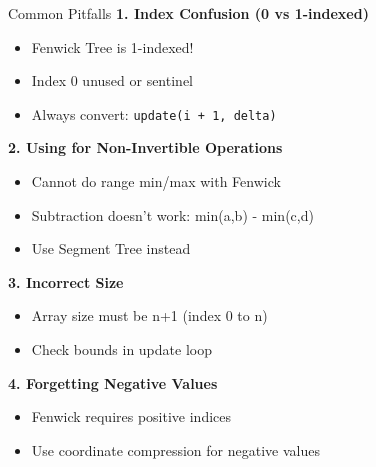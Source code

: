 \documentclass[aspectratio=169]{beamer}
\begin{document}
\begin{frame}{Common Pitfalls}
  \textbf{1. Index Confusion (0 vs 1-indexed)}
  \begin{itemize}
    \item Fenwick Tree is 1-indexed!
    \item Index 0 unused or sentinel
    \item Always convert: \texttt{update(i + 1, delta)}
  \end{itemize}

  \vspace{0.3cm}
  \textbf{2. Using for Non-Invertible Operations}
  \begin{itemize}
    \item Cannot do range min/max with Fenwick
    \item Subtraction doesn't work: min(a,b) - min(c,d)
    \item Use Segment Tree instead
  \end{itemize}

  \vspace{0.3cm}
  \textbf{3. Incorrect Size}
  \begin{itemize}
    \item Array size must be n+1 (index 0 to n)
    \item Check bounds in update loop
  \end{itemize}

  \vspace{0.3cm}
  \textbf{4. Forgetting Negative Values}
  \begin{itemize}
    \item Fenwick requires positive indices
    \item Use coordinate compression for negative values
  \end{itemize}
\end{frame}
\end{document}
